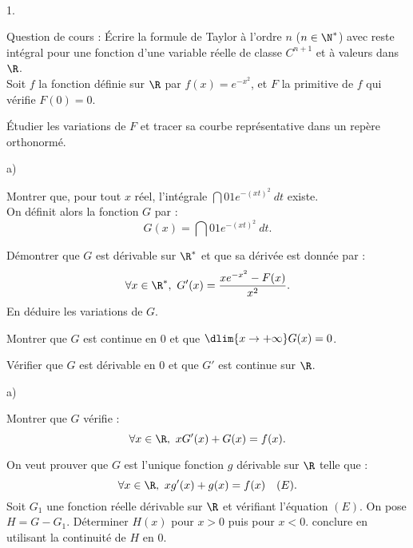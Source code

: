 \documentclass[11pt]{article}%
\begin{document}
\newpage

\begin{exerciceAP}~ 
  \begin{noliste}{1.}
    \setlength{\itemsep}{2mm}
  \item Question de cours : Écrire la formule de Taylor à l'ordre $n$
    ($n \in \N^*$) avec reste intégral pour une fonction d'une
    variable réelle de classe $C^{n+1}$ et à valeurs dans $\R$.
    \\[.2cm]
    Soit $f$ la fonction définie sur $\R$ par $f(x) = e^{-x^2}$, et
    $F$ la primitive de $f$ qui vérifie $F(0) = 0$.
  \item Étudier les variations de $F$ et tracer sa courbe
    représentative dans un repère orthonormé.
  \item \begin{noliste}{a)}
    \setlength{\itemsep}{2mm}
    \item Montrer que, pour tout $x$ réel, l'intégrale $\dint{0}{1}
      e^{- (xt)^2}\ dt$ existe. \\
      On définit alors la fonction $G$ par :
      \[
      G(x) = \dint{0}{1} e^{-(xt)^2}\ dt. 
      \]
    \item Démontrer que $G$ est dérivable sur $\R^*$ et que sa dérivée
      est donnée par :
      \[
      \forall x \in \R^*,\ G'(x) = \frac{x e^{-x^2} - F(x) }{x^2}.
      \]
      En déduire les variations de $G$.
    \item Montrer que $G$ est continue en 0 et que $\dlim{x
        \rightarrow +\infty} G(x) = 0$.
    \item Vérifier que $G$ est dérivable en 0 et que $G'$ est continue
      sur $\R$.
    \end{noliste}
  \item
    \begin{noliste}{a)}
    \setlength{\itemsep}{2mm} 
    \item Montrer que $G$ vérifie : 
      \[
      \forall x \in \R,\ x G'(x) + G(x) = f(x).
      \]
    \item On veut prouver que $G$ est l'unique fonction $g$ dérivable
      sur $\R$ telle que :
      \[
      \forall x \in \R,\ x g'(x) + g(x) = f(x) \ \ \ (E).
      \]
      Soit $G_1$ une fonction réelle dérivable sur $\R$ et vérifiant
      l'équation $(E)$. On pose $H = G - G_1$. Déterminer $H(x)$ pour
      $x > 0$ puis pour $x < 0$. conclure en utilisant la continuité
      de $H$ en 0.
    \end{noliste} 
  \end{noliste}
\end{exerciceAP}
\end{document}
